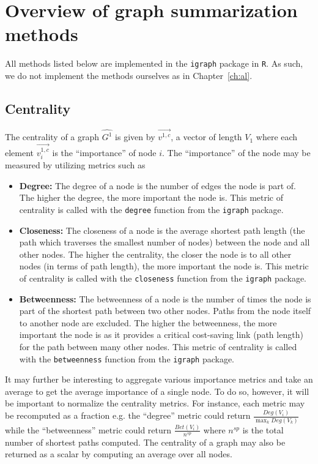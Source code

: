 \section{Overview of graph summarization methods}
\label{sec:gc:methods}

All methods listed below are implemented in the \texttt{igraph} package in 
\texttt{R}. As such, we do not implement the methods ourselves as in 
Chapter~\ref{ch:al}.

\subsection{Centrality}

The centrality of a graph $\hat{G^1}$ is given by $\overrightarrow{v^{1,c}}$,  
a vector of length $V_1$ where each element 
$\overrightarrow{v^{1,c}_i}$ is the ``importance'' of node $i$. The 
``importance'' of the node may be measured by utilizing metrics such as 

\tablespacing
\begin{itemize}
	\item \textbf{Degree:} The degree of a node is the number of edges the node 
	is part of. The higher the degree, the more important the node is.	
	This metric of centrality is called with the 	
	\texttt{degree} function from the \texttt{igraph} package.
	\item \textbf{Closeness:} The closeness of a node is the average 
	shortest path length (the path which traverses the smallest number of 
	nodes) between the node and all other nodes. The higher the centrality, 
	the closer the node is to all other nodes (in terms of path length), the 
	more important the node is.	
	This metric of centrality is called with the 
	\texttt{closeness} function from the \texttt{igraph} package.
	\item \textbf{Betweenness:} The betweenness of a node is the number of 
	times the node is part of the shortest path between two other nodes. Paths 
	from the node itself to another node are excluded. The higher the 
	betweenness, the more important the node is as it provides a critical 
	cost-saving link (path length) for the path between many other nodes. 
	This metric of centrality is called with the 
	\texttt{betweenness} function from the \texttt{igraph} package.
\end{itemize}
\bodyspacing

It may further be interesting to aggregate various importance metrics and take 
an average to get the average importance of a single node. To do so, however, 
it will be important to normalize the centrality metrics. For instance, each 
metric may be recomputed as a fraction e.g. the ``degree'' metric could return 
$\frac{Deg(V_i)}{\max_k Deg(V_k)}$ while the ``betweenness'' metric could 
return $\frac{Bet(V_i)}{n^{sp}}$ where $n^{sp}$ is the total number of shortest 
paths computed. The centrality of a graph may also be returned as a scalar by 
computing an average over all nodes.

